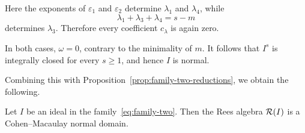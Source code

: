 Here the exponents of $\varepsilon_1$ and $\varepsilon_2$ determine
$\lambda_1$ and $\lambda_4$, while
$$
 \lambda_1+\lambda_3+\lambda_4=s-m
$$
determines $\lambda_3$.  Therefore every coefficient $c_\lambda$ is again
zero.

In both cases, $\omega=0$, contrary to the minimality of $m$.  It follows
that $I^s$ is integrally closed for every $s\geq1$, and hence $I$ is normal.

Combining this with Proposition~\ref{prop:family-two-reductions}, we obtain
the following.

\begin{theorem}
\label{thm:family-two}
Let $I$ be an ideal in the family~\eqref{eq:family-two}.  Then the Rees
algebra $\mathcal R(I)$ is a Cohen--Macaulay normal domain.
\end{theorem}

